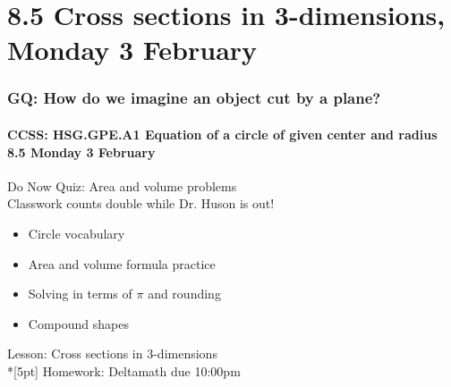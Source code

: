 \documentclass{beamer}
\begin{document}
\section{8.5 Cross sections in 3-dimensions, Monday 3 February}
\frame
{
  \frametitle{GQ: How do we imagine an object cut by a plane?}
  \framesubtitle{CCSS: HSG.GPE.A1 Equation of a circle of given center and radius \hfill \alert{8.5 Monday 3 February}}

  \begin{block}{Do Now Quiz: Area and volume problems\\[0.25cm]
    \alert{Classwork counts double while Dr. Huson is out!}}
  \begin{itemize}
    \item Circle vocabulary
    \item Area and volume formula practice
    \item Solving in terms of $\pi$ and rounding
    \item Compound shapes
  \end{itemize}
  \end{block}
  Lesson: Cross sections in 3-dimensions\\*[5pt]
  Homework: Deltamath due 10:00pm
}
\end{document}
